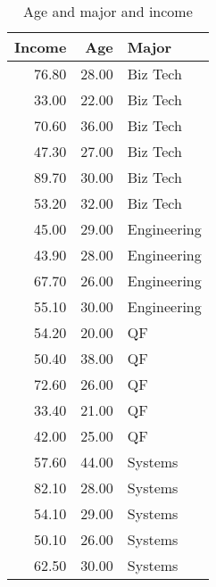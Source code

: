 \documentclass[11pt]{exam}
\begin{document}
\begin{table}[ht]
\begin{center}
\begin{tabular}{rrl}
  \hline
Income & Age & Major \\ 
  \hline
76.80 & 28.00 & Biz Tech \\ 
  33.00 & 22.00 & Biz Tech \\ 
  70.60 & 36.00 & Biz Tech \\ 
  47.30 & 27.00 & Biz Tech \\ 
  89.70 & 30.00 & Biz Tech \\ 
  53.20 & 32.00 & Biz Tech \\ 
  45.00 & 29.00 & Engineering \\ 
  43.90 & 28.00 & Engineering \\ 
  67.70 & 26.00 & Engineering \\ 
  55.10 & 30.00 & Engineering \\ 
  54.20 & 20.00 & QF \\ 
  50.40 & 38.00 & QF \\ 
  72.60 & 26.00 & QF \\ 
  33.40 & 21.00 & QF \\ 
  42.00 & 25.00 & QF \\ 
  57.60 & 44.00 & Systems \\ 
  82.10 & 28.00 & Systems \\ 
  54.10 & 29.00 & Systems \\ 
  50.10 & 26.00 & Systems \\ 
  62.50 & 30.00 & Systems \\ 
   \hline
\end{tabular}
\caption{Age and major and income}
\label{tab:major}
\end{center}
\end{table}
\end{document}

